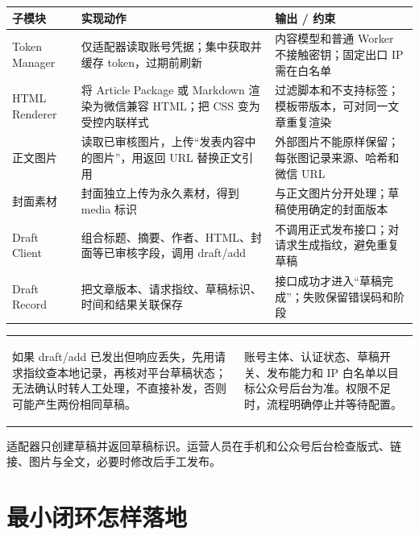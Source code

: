 \documentclass[UTF8,10pt,a4paper,fontset=none]{ctexart}
\begin{document}
\begin{tabularx}{\textwidth}{@{}L{31mm} Y L{48mm}@{}}
\toprule
\textbf{子模块} & \textbf{实现动作} & \textbf{输出 / 约束} \\
\midrule
Token Manager & 仅适配器读取账号凭据；集中获取并缓存 token，过期前刷新 & 内容模型和普通 Worker 不接触密钥；固定出口 IP 需在白名单 \\
HTML Renderer & 将 Article Package 或 Markdown 渲染为微信兼容 HTML；把 CSS 变为受控内联样式 & 过滤脚本和不支持标签；模板带版本，可对同一文章重复渲染 \\
正文图片 & 读取已审核图片，上传“发表内容中的图片”，用返回 URL 替换正文引用 & 外部图片不能原样保留；每张图记录来源、哈希和微信 URL \\
封面素材 & 封面独立上传为永久素材，得到 media 标识 & 与正文图片分开处理；草稿使用确定的封面版本 \\
Draft Client & 组合标题、摘要、作者、HTML、封面等已审核字段，调用 draft/add & 不调用正式发布接口；对请求生成指纹，避免重复草稿 \\
Draft Record & 把文章版本、请求指纹、草稿标识、时间和结果关联保存 & 接口成功才进入“草稿完成”；失败保留错误码和阶段 \\
\bottomrule
\end{tabularx}

\begin{tabularx}{\textwidth}{@{}Y Y@{}}
\begin{orangebox}[超时不能直接重试]
如果 draft/add 已发出但响应丢失，先用请求指纹查本地记录，再核对平台草稿状态；无法确认时转人工处理，不直接补发，否则可能产生两份相同草稿。
\end{orangebox} &
\begin{keybox}[权限必须先实测]
账号主体、认证状态、草稿开关、发布能力和 IP 白名单以目标公众号后台为准。权限不足时，流程明确停止并等待配置。
\end{keybox}
\end{tabularx}

\begin{greenbox}[人工发布边界]
适配器只创建草稿并返回草稿标识。运营人员在手机和公众号后台检查版式、链接、图片与全文，必要时修改后手工发布。
\end{greenbox}

\clearpage

\section{最小闭环怎样落地}
\end{document}
